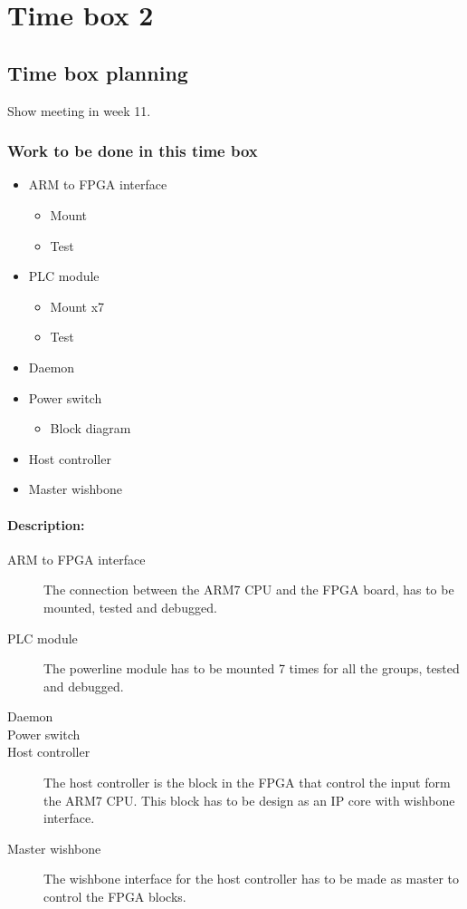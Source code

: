 \section{Time box 2}
\subsection{Time box planning}
Show meeting in week 11.
\subsubsection{Work to be done in this time box}
\begin{itemize}
	\item ARM to FPGA interface
	\begin{itemize}
		\item Mount
		\item Test
	\end{itemize}
	\item PLC module
	\begin{itemize}
		\item Mount x7
		\item Test
	\end{itemize}
	\item Daemon
	\item Power switch
	\begin{itemize}
		\item Block diagram
	\end{itemize}
	\item Host controller
	\item Master wishbone
\end{itemize}
\paragraph{Description:}
\begin{description}
	\item[ARM to FPGA interface] The connection between the ARM7 CPU and the FPGA board, has to be mounted, tested and debugged.
	\item[PLC module] The powerline module has to be mounted 7 times for all the groups, tested and debugged.
	\item[Daemon] 
	\item[Power switch] 
	\item[Host controller] The host controller is the block in the FPGA that control the input form the ARM7 CPU. This block has to be design as an IP core with wishbone interface.
	\item[Master wishbone] The wishbone interface for the host controller has to be made as master to control the FPGA blocks.
\end{description}

